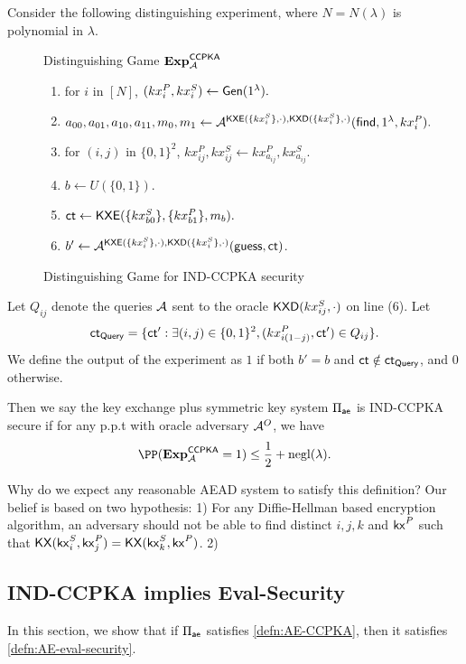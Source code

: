 \begin{definition}
\label{defn:AE-CCPKA}
Consider the following distinguishing experiment, where $N = N(\lambda)$ is polynomial in $\lambda$.
\begin{figure}[h!]
\begin{framed}
Distinguishing Game $\mathbf{Exp}^{\mathsf{CCPKA}}_{\mathcal{A}}$
\begin{enumerate}
    \item for $i$ in $[N]$, $(kx_{i}^P, kx_{i}^S) \leftarrow \mathsf{Gen}(1^{\lambda}).$
    \item $a_{00}, a_{01}, a_{10}, a_{11}, m_0, m_1 \leftarrow \mathcal{A}^{\mathsf{KXE}(\{kx_{i}^S\}, \cdot), \mathsf{KXD}(\{kx_{i}^S\}, \cdot)}(\mathsf{find}, 1^{\lambda}, kx_{i}^P).$
    \item for $(i, j)$ in $\{0, 1\}^2$, $kx^{P}_{ij}, kx^S_{ij} \leftarrow kx^P_{a_{ij}}, kx^S_{a_{ij}}$. 
    \item $b \leftarrow U(\{0, 1\})$.
    \item $\mathsf{ct} \leftarrow \mathsf{KXE}(\{kx_{b0}^S\}, \{kx_{b1}^P\}, m_b).$
    \item $b' \leftarrow \mathcal{A}^{\mathsf{KXE}(\{kx_{i}^S\}, \cdot), \mathsf{KXD}(\{kx_{i}^S\}, \cdot)}(\mathsf{guess}, \mathsf{ct})$.
\end{enumerate}
\end{framed}
\caption{Distinguishing Game for IND-CCPKA security}
\label{expr:AE-CCPKA-Distinguish}
\end{figure}

Let $Q_{ij}$ denote the queries $\mathcal{A}$ sent to the oracle $\mathsf{KXD}(kx_{ij}^S, \cdot)$ on line (6). Let
$$\mathsf{ct}_{\mathsf{Query}} = \{\mathsf{ct}': \exists (i,j) \in \{0, 1\}^2, (kx_{i(1 - j)}^P, \mathsf{ct}') \in Q_{ij}\}.$$
We define the output of the experiment as $1$ if both $b' = b$ and $\mathsf{ct} \notin \mathsf{ct}_{\mathsf{Query}}$, and $0$ otherwise. 

Then we say the key exchange plus symmetric key system $\Pi_{\mathsf{ae}}$ is IND-CCPKA secure if for any p.p.t with oracle adversary $\mathcal{A}^O$, we have
$$\PP(\mathbf{Exp}^{\mathsf{CCPKA}}_{\cA} = 1) \leq \frac{1}{2} + \negl(\lambda).$$
\end{definition}
Why do we expect any reasonable AEAD system to satisfy this definition? Our belief is based on two hypothesis: 1) For any Diffie-Hellman based encryption algorithm, an adversary should not be able to find distinct $i, j, k$ and $\mathsf{kx}^P$ such that $\mathsf{KX}(\mathsf{kx}_i^S, \mathsf{kx}_j^P) = \mathsf{KX}(\mathsf{kx}_k^S, \mathsf{kx}^P)$. 2) 
\subsection{IND-CCPKA implies Eval-Security}
In this section, we show that if $\Pi_{\mathsf{ae}}$ satisfies \cref{defn:AE-CCPKA}, then it satisfies \cref{defn:AE-eval-security}.

